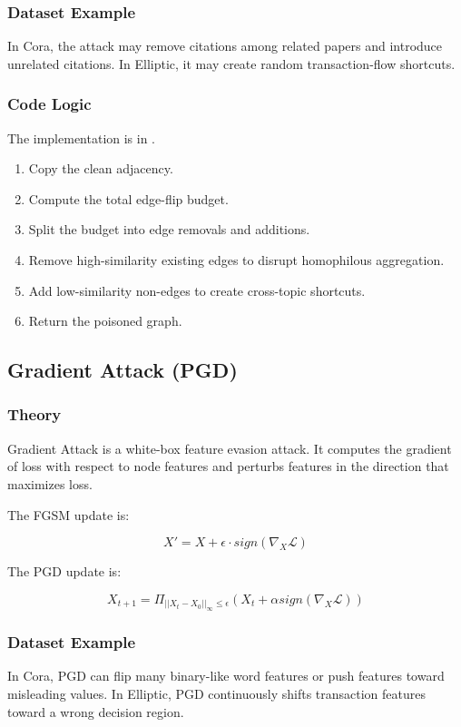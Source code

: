 \documentclass[12pt,a4paper]{article}
\begin{document}
\subsubsection{Dataset Example}
In Cora, the attack may remove citations among related papers and introduce unrelated citations. In Elliptic, it may create random transaction-flow shortcuts.

\subsubsection{Code Logic}
The implementation is in .

\begin{enumerate}
    \item Copy the clean adjacency.
    \item Compute the total edge-flip budget.
    \item Split the budget into edge removals and additions.
    \item Remove high-similarity existing edges to disrupt homophilous aggregation.
    \item Add low-similarity non-edges to create cross-topic shortcuts.
    \item Return the poisoned graph.
\end{enumerate}

\subsection{Gradient Attack (PGD)}
\subsubsection{Theory}
Gradient Attack is a white-box feature evasion attack. It computes the gradient of loss with respect to node features and perturbs features in the direction that maximizes loss.

The FGSM update is:

$$
X'=X+\epsilon\cdot sign(\nabla_X\mathcal{L})
$$

The PGD update is:

$$
X_{t+1}=\Pi_{||X_t-X_0||_\infty\leq \epsilon}(X_t+\alpha sign(\nabla_X\mathcal{L}))
$$

\subsubsection{Dataset Example}
In Cora, PGD can flip many binary-like word features or push features toward misleading values. In Elliptic, PGD continuously shifts transaction features toward a wrong decision region.
\end{document}
